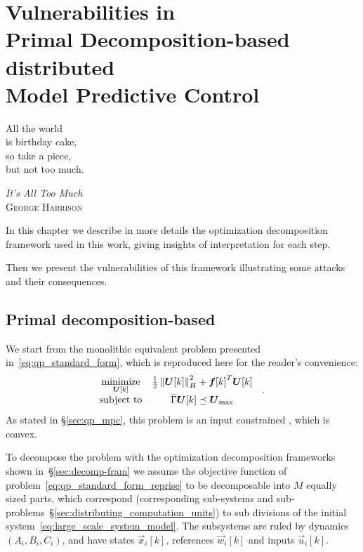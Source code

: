\documentclass[../main.tex]{subfiles}
\begin{document}
\chapter[Vulnerabilities in Primal Decomposition-based dMPC]{Vulnerabilities in \\Primal Decomposition-based \\distributed \\Model Predictive Control}\label{sec:primal_decomposition}
\epigraph{\centering All the world\\ is birthday cake,\\ so take a piece, \\but not too much.}
{\textit{It's All Too Much}\\\textsc{George Harrison}}

In this chapter we describe in more details the optimization decomposition framework used in this work, giving insights of interpretation for each step.

Then we present the vulnerabilities of this framework illustrating some attacks and their consequences.

\minitoc

\section{Primal decomposition-based \dmpc{}}\label{sec:decomposition_PD}

We start from the monolithic \mpc{} equivalent problem presented in~\eqref{eq:qp_standard_form}, which is reproduced here for the reader's convenience:
\begin{equation}
  \label{eq:qp_standard_form_reprise}
  \begin{aligned}
    \begin{matrix}
      \underset{\boldsymbol{U}[k]}{\mathrm{minimize}} &
      \frac{1}{2}\left\lVert\boldsymbol{U}[k]\right\rVert^{2}_{H} + {\boldsymbol{f}[k]}^{T}\boldsymbol{U}[k] &\\
      \mathrm{subject~ to} &
\bar{\Gamma}\boldsymbol{U}[k]\preceq {\boldsymbol{U}}_{\text{max}}
    \end{matrix}
  \end{aligned}.
\end{equation}
As stated in \S\ref{sec:qp_mpc}, this problem is an input constrained \qp{}, which is convex.

To decompose the problem with the optimization decomposition frameworks shown in~\S\ref{sec:decomp-fram} we assume the objective function of problem~\eqref{eq:qp_standard_form_reprise} to be decomposable into $M$ equally sized parts, which correspond (corresponding sub-systems and sub-problems~\S\ref{sec:distributing_computation_units}) to sub divisions of the initial system~\eqref{eq:large_scale_system_model}.
The subsystems are ruled by dynamics $(A_{i},B_{i},C_{i})$, and have states $\vec{x}_{i}[k]$, references $\vec{w}_{i}[k]$ and inputs $\vec{u}_{i}[k]$.
\end{document}
